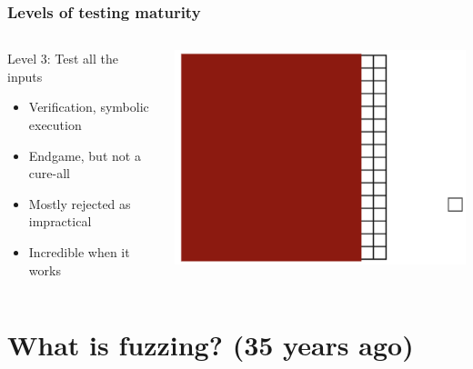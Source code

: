 \documentclass{beamer}
\begin{document}
	\begin{frame}
		\frametitle{Levels of testing maturity}
	\begin{columns}[onlytextwidth]
		\begin{column}{.5\textwidth}
Level 3: Test all the inputs
	\begin{itemize}
		\item{Verification, symbolic execution}
		\item{Endgame, but not a cure-all}
		\item{Mostly rejected as impractical}
		\item{Incredible when it works}
	\end{itemize}
		\end{column}
		\begin{column}{.5\textwidth}
			\centering \includegraphics[scale=.75]{phase3}
		\end{column}
	\end{columns}

\end{frame}

\section[What is fuzzing?]{What is fuzzing? \normalsize{(35 years ago)}}
\end{document}
